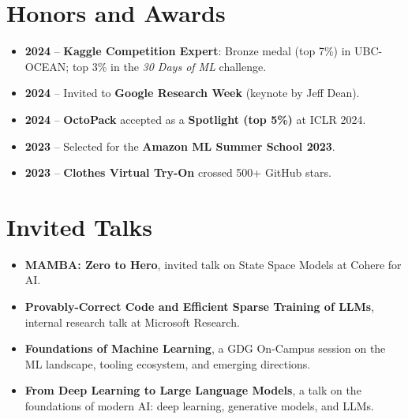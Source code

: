 \documentclass[a4paper,11pt]{article}
\newcommand{\resumeItemPlain}[1]{\item\small{#1}\vspace{-1pt}}
\newcommand{\resumeItemListStart}{\begin{itemize}[leftmargin=1.3em, label=$\bullet$, itemsep=1pt, topsep=2pt, parsep=0pt]}
\newcommand{\resumeItemListEnd}{\end{itemize}\vspace{-3pt}}
\begin{document}
\vspace{-2pt}
\section{Honors and Awards}
\resumeItemListStart
  \resumeItemPlain{\textbf{2024} -- \textbf{Kaggle Competition Expert}: Bronze medal (top 7\%) in UBC-OCEAN; top 3\% in the \textit{30 Days of ML} challenge.}
  \resumeItemPlain{\textbf{2024} -- Invited to \textbf{Google Research Week} (keynote by Jeff Dean).}
  \resumeItemPlain{\textbf{2024} -- \textbf{OctoPack} accepted as a \textbf{Spotlight (top 5\%)} at ICLR 2024.}
  \resumeItemPlain{\textbf{2023} -- Selected for the \textbf{Amazon ML Summer School 2023}.}
  \resumeItemPlain{\textbf{2023} -- \textbf{Clothes Virtual Try-On} crossed 500+ GitHub stars.}
\resumeItemListEnd

\vspace{-2pt}
\section{Invited Talks}
\resumeItemListStart
  \resumeItemPlain{\textbf{MAMBA: Zero to Hero}, invited talk on State Space Models at Cohere for AI.}
  \resumeItemPlain{\textbf{Provably-Correct Code and Efficient Sparse Training of LLMs}, internal research talk at Microsoft Research.}
  \resumeItemPlain{\textbf{Foundations of Machine Learning}, a GDG On-Campus session on the ML landscape, tooling ecosystem, and emerging directions.}
  \resumeItemPlain{\textbf{From Deep Learning to Large Language Models}, a talk on the foundations of modern AI: deep learning, generative models, and LLMs.}
\resumeItemListEnd
\end{document}
